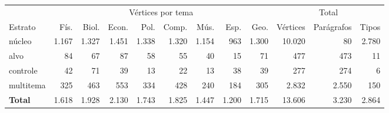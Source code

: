 \footnotesize
\setlength{\tabcolsep}{4pt}
\begin{tabular}{lrrrrrrrrrrr}
\toprule
 & \multicolumn{8}{c}{Vértices por tema} & \multicolumn{3}{c}{Total} \\
\cmidrule(lr){2-9}\cmidrule(l){10-12}
Estrato & Fís. & Biol. & Econ. & Pol. & Comp. & Mús. & Esp. & Geo. & Vértices & Parágrafos & Tipos \\
\midrule
núcleo & 1.167 & 1.327 & 1.451 & 1.338 & 1.320 & 1.154 & 963 & 1.300 & 10.020 & 80 & 2.780 \\
alvo & 84 & 67 & 87 & 58 & 55 & 40 & 15 & 71 & 477 & 473 & 11 \\
controle & 42 & 71 & 39 & 13 & 22 & 13 & 38 & 39 & 277 & 274 & 6 \\
multitema & 325 & 463 & 553 & 334 & 428 & 240 & 184 & 305 & 2.832 & 2.550 & 150 \\
\midrule
\textbf{Total} & 1.618 & 1.928 & 2.130 & 1.743 & 1.825 & 1.447 & 1.200 & 1.715 & 13.606 & 3.230 & 2.864 \\
\bottomrule
\end{tabular}

\par{}
